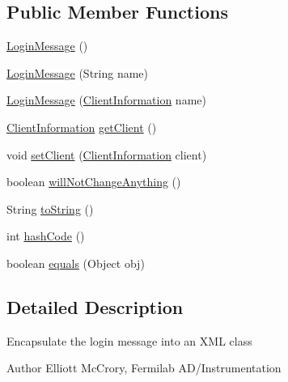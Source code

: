 \subsection*{Public Member Functions}
\begin{DoxyCompactItemize}
\item 
\hyperlink{classgov_1_1fnal_1_1ppd_1_1dd_1_1xml_1_1messages_1_1LoginMessage_a769243cf20ed4468766a7a44861ef44e}{Login\-Message} ()
\item 
\hyperlink{classgov_1_1fnal_1_1ppd_1_1dd_1_1xml_1_1messages_1_1LoginMessage_a359cbdaa8c0b651c520833d821601838}{Login\-Message} (String name)
\item 
\hyperlink{classgov_1_1fnal_1_1ppd_1_1dd_1_1xml_1_1messages_1_1LoginMessage_aeb431ea35155c9acd8a8d5e8ab25ed68}{Login\-Message} (\hyperlink{classgov_1_1fnal_1_1ppd_1_1dd_1_1xml_1_1ClientInformation}{Client\-Information} name)
\item 
\hyperlink{classgov_1_1fnal_1_1ppd_1_1dd_1_1xml_1_1ClientInformation}{Client\-Information} \hyperlink{classgov_1_1fnal_1_1ppd_1_1dd_1_1xml_1_1messages_1_1LoginMessage_a6d04d23746ecef9cdcb08cedc0e70a07}{get\-Client} ()
\item 
void \hyperlink{classgov_1_1fnal_1_1ppd_1_1dd_1_1xml_1_1messages_1_1LoginMessage_a361b05557fdd99109f6a6bbab09333f0}{set\-Client} (\hyperlink{classgov_1_1fnal_1_1ppd_1_1dd_1_1xml_1_1ClientInformation}{Client\-Information} client)
\item 
boolean \hyperlink{classgov_1_1fnal_1_1ppd_1_1dd_1_1xml_1_1messages_1_1LoginMessage_aa066d4b4065eb13c076c6b6c81474fe8}{will\-Not\-Change\-Anything} ()
\item 
String \hyperlink{classgov_1_1fnal_1_1ppd_1_1dd_1_1xml_1_1messages_1_1LoginMessage_a2adb48db367bb5a3c1c2b9186358393c}{to\-String} ()
\item 
int \hyperlink{classgov_1_1fnal_1_1ppd_1_1dd_1_1xml_1_1messages_1_1LoginMessage_af1b944576e143ba9f5682d9830708c30}{hash\-Code} ()
\item 
boolean \hyperlink{classgov_1_1fnal_1_1ppd_1_1dd_1_1xml_1_1messages_1_1LoginMessage_aba9b26e474436d61829f45040baaa43a}{equals} (Object obj)
\end{DoxyCompactItemize}


\subsection{Detailed Description}
Encapsulate the login message into an X\-M\-L class

\begin{DoxyAuthor}{Author}
Elliott Mc\-Crory, Fermilab A\-D/\-Instrumentation 
\end{DoxyAuthor}


